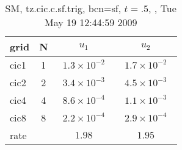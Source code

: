 \begin{table}[hbt]\tableFont %
\begin{center}
\begin{tabular}{|l|c|c|c|} \hline 
grid  & N &  $u_1$ & $u_2$  \\ \hline 
                cic1 &     1 & ~$1.3\times10^{ -2}$~ & ~$1.7\times10^{ -2}$~  \\ \hline
                cic2 &     2 & ~$3.4\times10^{ -3}$~ & ~$4.5\times10^{ -3}$~  \\ \hline
                cic4 &     4 & ~$8.6\times10^{ -4}$~ & ~$1.1\times10^{ -3}$~  \\ \hline
                cic8 &     8 & ~$2.2\times10^{ -4}$~ & ~$2.9\times10^{ -4}$~  \\ \hline
    rate             &       &       $1.98$          &       $1.95$           \\ \hline
\end{tabular}
\caption{SM, tz.cic.c.sf.trig, bcn=sf, $t=.5$, , Tue May 19 12:44:59 2009}\label{table:tz.cic.c.sf.trig}
\end{center}
\end{table}
